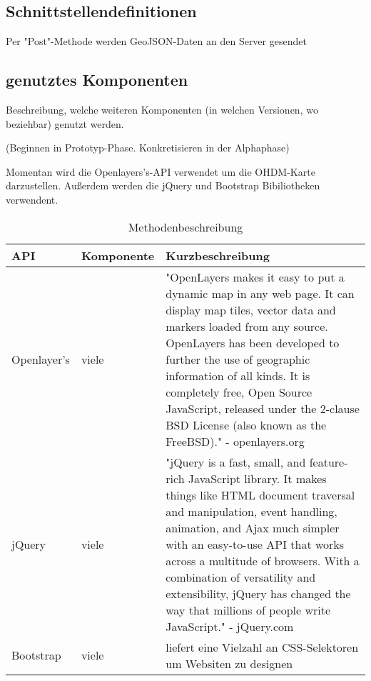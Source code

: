 \documentclass[a4paper, 12.5pt]{scrartcl}
\begin{document}
\subsection{Schnittstellendefinitionen}

Per "Post"-Methode werden GeoJSON-Daten an den Server gesendet

\subsection{genutztes Komponenten}
Beschreibung, welche weiteren Komponenten (in welchen Versionen, wo beziehbar) genutzt werden.

(Beginnen in Prototyp-Phase. Konkretisieren in der Alphaphase)

Momentan wird die Openlayers's-API verwendet um die OHDM-Karte darzustellen.
Außerdem werden die jQuery und Bootstrap Bibiliotheken verwendent.

\begin{table}[h]
    \begin{tabular}{|l|l|p{4cm}|}
        \hline
        API & Komponente & Kurzbeschreibung \\
        \hline
        Openlayer's & viele & "OpenLayers makes it easy to put a dynamic map in any web page. It can display map tiles, vector data and markers loaded from any source. OpenLayers has been developed to further the use of geographic information of all kinds. It is completely free, Open Source JavaScript, released under the 2-clause BSD License (also known as the FreeBSD)." - openlayers.org\newline
        \\
        \hline
        jQuery & viele & "jQuery is a fast, small, and feature-rich JavaScript library. It makes things like HTML document traversal and manipulation, event handling, animation, and Ajax much simpler with an easy-to-use API that works across a multitude of browsers. With a combination of versatility and extensibility, jQuery has changed the way that millions of people write JavaScript." - jQuery.com\newline
        \\
        \hline
        Bootstrap & viele & liefert eine Vielzahl an CSS-Selektoren um Websiten zu designen \newline
        \\
        \hline
    \end{tabular}
    \caption{Methodenbeschreibung}
\end{table}
\end{document}
